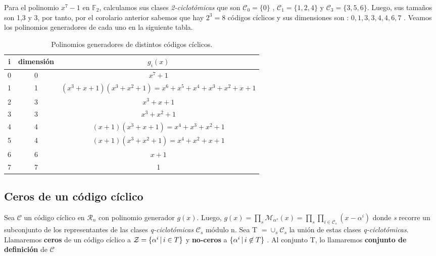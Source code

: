 \begin{exampleth}
Para el polinomio $x^7-1$ en $\mathbb{F}_2$, calculamos sus clases \textit{2-ciclotómicas} que son $\mathcal{C}_0 = \{ 0 \}$ , $\mathcal{C}_1 = \{ 1,2,4 \}$ y $\mathcal{C}_3 = \{ 3,5,6 \}$. Luego, sus tamaños son 1,3 y 3, por tanto, por el corolario anterior sabemos que hay $2^3 = 8$ códigos cíclicos y sus dimensiones son : $0,1,3,3,4,4,6,7$ . Veamos los polinomios generadores de cada uno en la siguiente tabla.

\begin{table}[b]
 \begin{tabular}{ c | c | c}
	i & dimensión & $g_i(x)$ \\ \hline
	0 & 0 & $ x^7 + 1$ \\
	1 & 1 & $ (x^3+x+1)(x^3+x^2+1) = x^6+x^5+x^4+x^3+x^2+x+1$ \\ 
	2 & 3 & $x^3+x+1 $ \\
	3 & 3 & $ x^3+x^2+1$ \\
	4 & 4 & $(x+1)(x^3+x+1) = x^4+x^3+x^2+1$ \\
	5 & 4 & $(x+1)(x^3+x^2+1) = x^4+x^2+x+1$ \\
	6 & 6 & $x+1$ \\ 
	7 & 7 & 1

	\end{tabular}
\caption{Polinomios generadores de distintos códigos cíclicos.}
\end{table}
\end{exampleth}

\subsection{Ceros de un código cíclico}

\begin{definition}
Sea $\mathcal{C}$ un código cíclico en $\mathcal{R}_n$ con polinomio generador $g(x)$. Luego, $g(x) = \prod_{s} \mathcal{M}_{\alpha^s}(x) = \prod_{s} \prod_{i \in \mathcal{C}_s} (x-\alpha^i) $ donde \textit{s} recorre un subconjunto de los representantes de las clases \textit{q-ciclotómicas} $\mathcal{C}_s$ módulo n. Sea T $ = \cup_s \mathcal{C}_s$ la unión de estas clases \textit{q-ciclotómicas}. Llamaremos \textbf{ceros} de un código cíclico a $\mathcal{Z} = \{ \alpha^i \thinspace | \thinspace i \in T \}$ y \textbf{no-ceros} a $\{ \alpha^i \thinspace | \thinspace i \not\in T \}$ . Al conjunto T, lo llamaremos \textbf{conjunto de definición} de $\mathcal{C}$
\end{definition}

